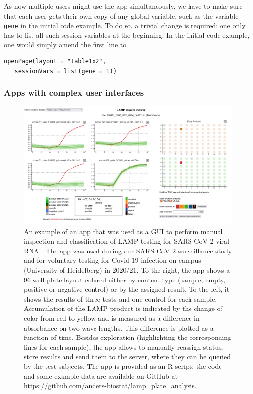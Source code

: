 \documentclass[twocolumn,10pt]{article}
\begin{document}
As now multiple users might use the app simultaneously, we have to make sure that each user gets their own copy of any global variable, such as the variable \texttt{gene} in the initial code example. To do so, a trivial change is required: one only has to list all such session variables at the beginning. In the initial code example, one would simply amend the first line to 
\begin{verbatim}
openPage(layout = "table1x2", 
   sessionVars = list(gene = 1))
\end{verbatim}

\subsubsection{Apps with complex user interfaces}\label{gui_apps}

\begin{figure}[t]
   \centering\includegraphics[width=.85\textwidth]{FigG/figG.png}
   \caption{An example of an app that was used as a GUI to perform manual inspection and classification of LAMP testing for SARS-CoV-2 viral RNA \citep{daothi_2020,Lou_2023}. The app was used during our SARS-CoV-2 surveillance study \citep{deckert_2021} and for voluntary testing for Covid-19 infection on campus (University of Heidelberg) in 2020/21. To the right, the app shows a 96-well plate layout colored either by content type (sample, empty, positive or negative control) or by the assigned result. To the left, it shows the results of three tests and one control for each sample. Accumulation of the LAMP product is indicated by the change of color from red to yellow and is measured as a difference in absorbance on two wave lengths. This difference is plotted as a function of time. Besides exploration (highlighting the corresponding lines for each sample), the app allows to manually reassign status, store results and send them to the server, where they can be queried by the test subjects. The app is provided as an R script; the code and some example data are available on GitHub at \url{https://github.com/anders-biostat/lamp_plate_analysis}.}
   \label{lc_FigG}
\end{figure}
\end{document}
